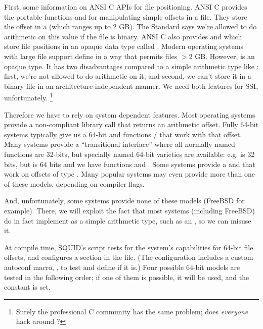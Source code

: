 \documentclass[12pt]{report}
\begin{document}
First, some information on ANSI C APIs for file positioning. ANSI C
provides the portable functions  and  for
manipulating simple offsets in a file. They store the offset in a
 (which ranges up to 2 GB). The Standard says we're allowed
to do arithmetic on this value if the file is binary. ANSI C also
provides  and  which store file
positions in an opaque data type called . Modern
operating systems with large file support define  in a
way that permits files $>$2 GB. However,  is an opaque
type. It has two disadvantages compared to a simple arithmetic type
like : first, we're not allowed to do arithmetic on it, and
second, we can't store it in a binary file in an
architecture-independent manner. We need both features for SSI,
unfortunately. \footnote{Surely the professional C community has the
same problem; does \emph{everyone} hack around ?}

Therefore we have to rely on system dependent features. Most operating
systems provide a non-compliant library call that returns an
arithmetic offset. Fully 64-bit systems typically give us a 64-bit
 and functions / that work
with that offset.  Many systems provide a ``transitional interface''
where all normally named functions are 32-bits, but specially named
64-bit varieties are available: e.g.  is 32 bits, but
 is 64 bits and we have functions  and
. Some systems provide a  and
 that work on offsets of type . Many
popular systems may even provide more than one of these models,
depending on compiler flags. 

And, unfortunately, some systems provide none of these models (FreeBSD
for example). There, we will exploit the fact that most systems
(including FreeBSD) do in fact implement  as a simple
arithmetic type, such as an , so we can misuse it.

At compile time, SQUID's  script tests for the
system's capabilities for 64-bit file offsets, and configures a
section in the  file. (The configuration includes a
custom autoconf macro, , to test
 and define  if it is.)  Four
possible 64-bit models are tested in the following order; if one of
them is possible, it will be used, and the constant
 is set.
\end{document}
